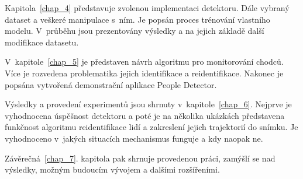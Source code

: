 Kapitola~\ref{chap_4} představuje zvolenou implementaci detektoru. Dále vybraný dataset a veškeré manipulace s~ním. Je popsán proces trénování vlastního modelu. V~průběhu jsou prezentovány výsledky a na jejich základě další modifikace datasetu.

V~kapitole~\ref{chap_5} je představen návrh algoritmu pro monitorování chodců. Více je rozvedena problematika jejich identifikace a reidentifikace. Nakonec je popsána vytvořená demonstrační aplikace People Detector.

Výsledky a provedení experimentů jsou shrnuty v~kapitole~\ref{chap_6}. Nejprve je vyhodnocena úspěšnost detektoru a poté je na několika ukázkách představena funkčnost algoritmu reidentifikace lidí a zakreslení jejich trajektorií do snímku. Je vyhodnoceno v~jakých situacích mechanismus funguje a kdy naopak ne.

Závěrečná~\ref{chap_7}. kapitola pak shrnuje provedenou práci, zamýšlí se nad výsledky, možným budoucím vývojem a dalšími rozšířeními.

